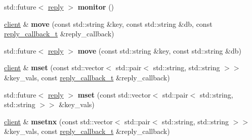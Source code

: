 \begin{DoxyCompactItemize}
\item 
\mbox{\label{classcpp__redis_1_1client_afd727179e9ee9348ced168a9ac70cbf7}} 
std\+::future$<$ \mbox{\hyperlink{classcpp__redis_1_1reply}{reply}} $>$ {\bfseries monitor} ()
\item 
\mbox{\label{classcpp__redis_1_1client_ad84393d728fb69b527a1d7b009270b58}} 
\mbox{\hyperlink{classcpp__redis_1_1client}{client}} \& {\bfseries move} (const std\+::string \&key, const std\+::string \&db, const \mbox{\hyperlink{classcpp__redis_1_1client_af7a65eb21aa25230bfbb0b0203c4fc04}{reply\+\_\+callback\+\_\+t}} \&reply\+\_\+callback)
\item 
\mbox{\label{classcpp__redis_1_1client_ab50d18d50ac6d0bb7b91347c3a574960}} 
std\+::future$<$ \mbox{\hyperlink{classcpp__redis_1_1reply}{reply}} $>$ {\bfseries move} (const std\+::string \&key, const std\+::string \&db)
\item 
\mbox{\label{classcpp__redis_1_1client_acd9e2a69abc97bb7735425fdaebe788d}} 
\mbox{\hyperlink{classcpp__redis_1_1client}{client}} \& {\bfseries mset} (const std\+::vector$<$ std\+::pair$<$ std\+::string, std\+::string $>$$>$ \&key\+\_\+vals, const \mbox{\hyperlink{classcpp__redis_1_1client_af7a65eb21aa25230bfbb0b0203c4fc04}{reply\+\_\+callback\+\_\+t}} \&reply\+\_\+callback)
\item 
\mbox{\label{classcpp__redis_1_1client_a369f84ea90c49095a3222d6f210410f8}} 
std\+::future$<$ \mbox{\hyperlink{classcpp__redis_1_1reply}{reply}} $>$ {\bfseries mset} (const std\+::vector$<$ std\+::pair$<$ std\+::string, std\+::string $>$$>$ \&key\+\_\+vals)
\item 
\mbox{\label{classcpp__redis_1_1client_ae04ade1f429088a437a4ea618a465a18}} 
\mbox{\hyperlink{classcpp__redis_1_1client}{client}} \& {\bfseries msetnx} (const std\+::vector$<$ std\+::pair$<$ std\+::string, std\+::string $>$$>$ \&key\+\_\+vals, const \mbox{\hyperlink{classcpp__redis_1_1client_af7a65eb21aa25230bfbb0b0203c4fc04}{reply\+\_\+callback\+\_\+t}} \&reply\+\_\+callback)
\item 
\mbox{\label{classcpp__redis_1_1client_a792ed8b2d5f3a38e8b9dfaef7f814d19}} 
$$
\end{DoxyCompactItemize}
